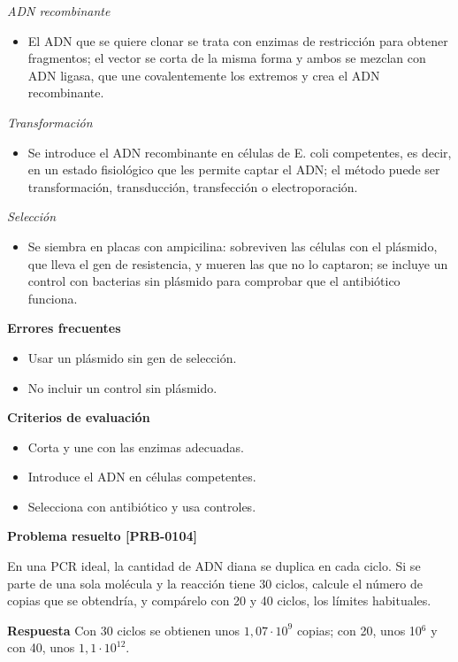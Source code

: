 \documentclass{book}
\begin{document}
\noindent\textit{ADN recombinante}
\begin{itemize}
\item El ADN que se quiere clonar se trata con enzimas de restricción para obtener fragmentos; el vector se corta de la misma forma y ambos se mezclan con ADN ligasa, que une covalentemente los extremos y crea el ADN recombinante.
\end{itemize}

\noindent\textit{Transformación}
\begin{itemize}
\item Se introduce el ADN recombinante en células de E. coli competentes, es decir, en un estado fisiológico que les permite captar el ADN; el método puede ser transformación, transducción, transfección o electroporación.
\end{itemize}

\noindent\textit{Selección}
\begin{itemize}
\item Se siembra en placas con ampicilina: sobreviven las células con el plásmido, que lleva el gen de resistencia, y mueren las que no lo captaron; se incluye un control con bacterias sin plásmido para comprobar que el antibiótico funciona.
\end{itemize}

\noindent\textbf{Errores frecuentes}
\begin{itemize}
\item Usar un plásmido sin gen de selección.
\item No incluir un control sin plásmido.
\end{itemize}

\noindent\textbf{Criterios de evaluación}
\begin{itemize}
\item Corta y une con las enzimas adecuadas.
\item Introduce el ADN en células competentes.
\item Selecciona con antibiótico y usa controles.
\end{itemize}

\noindent\textbf{Problema resuelto [PRB-0104]}

En una PCR ideal, la cantidad de ADN diana se duplica en cada ciclo. Si se parte de una sola molécula y la reacción tiene 30 ciclos, calcule el número de copias que se obtendría, y compárelo con 20 y 40 ciclos, los límites habituales.


\noindent\textbf{Respuesta}
Con 30 ciclos se obtienen unos \(1,07\cdot10^{9}\) copias; con 20, unos 10\({}^{6}\) y con 40, unos \(1,1\cdot10^{12}\).
\end{document}
